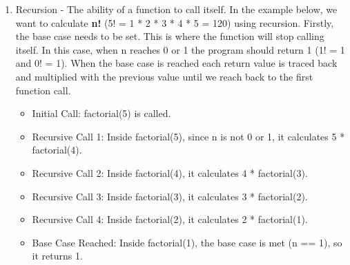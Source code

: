 \documentclass[12pt]{article}
\begin{document}
\begin{enumerate}
    \begin{lstlisting}[language=C]
        #include <stdio.h>

        int main() 
        {
            unsigned int n = 10, *p;
            p = &n;
        
            printf("Value of n: %u\n", n);
            printf("Address stored in p: %p\n", p);
        
            *p = 20;
            printf("Updated value of n: %u\n", n);
        
            *p += 5;
            printf("Value of n after increment: %u\n", n);
        
            return 0;
        }
    \end{lstlisting}

    \textbf{Console output:}
    \begin{lstlisting}[language=C]
        Value of n: 10
        Address stored in p: 0x7ffe56ffd18c
        Updated value of n: 20
        Value of n after increment: 25
    \end{lstlisting}
    
    \item Recursion - The ability of a function to call itself. In the example below, we want to calculate \textbf{n!} (5! = 1 * 2 * 3 * 4 * 5 = 120) using recursion. Firstly, the base case needs to be set. This is where the function will stop calling itself. In this case, when n reaches 0 or 1 the program should return 1 (1! = 1 and 0! = 1). When the base case is reached each return value is traced back and multiplied with the previous value until we reach back to the first function call.
    \begin{itemize}
        \item Initial Call: factorial(5) is called.
        \item Recursive Call 1: Inside factorial(5), since n is not 0 or 1, it calculates 5 * factorial(4).
        \item Recursive Call 2: Inside factorial(4), it calculates 4 * factorial(3).
        \item Recursive Call 3: Inside factorial(3), it calculates 3 * factorial(2).
        \item Recursive Call 4: Inside factorial(2), it calculates 2 * factorial(1).
        \item Base Case Reached: Inside factorial(1), the base case is met (n == 1), so it returns 1.
    \end{itemize}
    

\end{enumerate}
\end{document}

